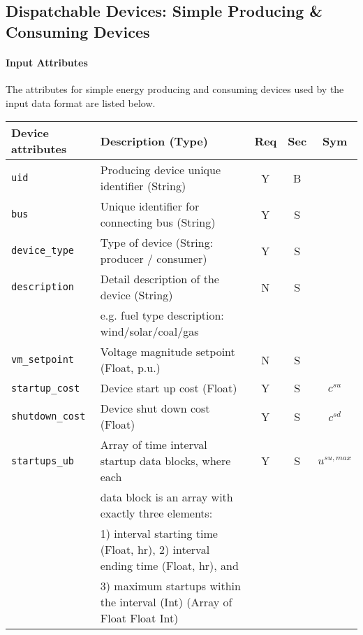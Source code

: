 \documentclass{article}
\begin{document}
\subsection{Dispatchable Devices: Simple Producing \& Consuming Devices}
\label{nom:gen_single}
\paragraph{Input Attributes} The attributes for
simple energy producing and consuming devices used by the input data format are listed below.
\begin{center}
\small
\begin{tabular}{ l | l | c | c | c |}
Device attributes & Description (Type) & Req & Sec & Sym\\
\hline
  {\tt uid} & Producing device unique identifier (String) & Y & B &  \\
  {\tt bus} & Unique identifier for connecting bus (String)& Y & S & \\
  {\tt device\_type} & Type of device (String: producer / consumer) & Y & S & \\
  {\tt description} & Detail description of the device  (String) & N & S & \\
      &e.g. fuel type description: wind/solar/coal/gas  &  &  & \\
  {\tt vm\_setpoint} & Voltage magnitude setpoint (Float, p.u.) & N & S & \\
  {\tt startup\_cost} & Device start up cost (Float) & Y & S & $c^{su}$\\
  {\tt shutdown\_cost} & Device shut down cost (Float) & Y & S & $c^{sd}$\\
  {\tt startups\_ub} & Array of time interval startup data blocks, where each & Y & S & $u^{su,max}$\\
                     & data block is an array with exactly three elements: &   &   & \\
                     & 1) interval starting time (Float, hr), 2) interval ending time (Float, hr), and &   &   & \\
                     & 3) maximum startups within the interval (Int) (Array of Float Float Int)  &   &   & \\


\end{tabular}
\end{center}
\end{document}
